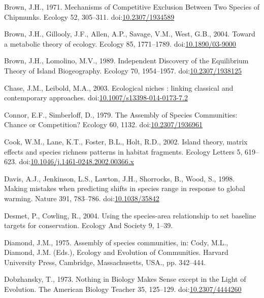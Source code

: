 \hypertarget{ref-Brown1971}{}
Brown, J.H., 1971. Mechanisms of Competitive Exclusion Between Two
Species of Chipmunks. Ecology 52, 305--311.
doi:\href{https://doi.org/10.2307/1934589}{10.2307/1934589}

\hypertarget{ref-Brown2004}{}
Brown, J.H., Gillooly, J.F., Allen, A.P., Savage, V.M., West, G.B.,
2004. Toward a metabolic theory of ecology. Ecology 85, 1771--1789.
doi:\href{https://doi.org/10.1890/03-9000}{10.1890/03-9000}

\hypertarget{ref-Brown1989}{}
Brown, J.H., Lomolino, M.V., 1989. Independent Discovery of the
Equilibrium Theory of Island Biogeography. Ecology 70, 1954--1957.
doi:\href{https://doi.org/10.2307/1938125}{10.2307/1938125}

\hypertarget{ref-Chase2003}{}
Chase, J.M., Leibold, M.A., 2003. Ecological niches : linking classical
and contemporary approaches.
doi:\href{https://doi.org/10.1007/s13398-014-0173-7.2}{10.1007/s13398-014-0173-7.2}

\hypertarget{ref-Connor1979}{}
Connor, E.F., Simberloff, D., 1979. The Assembly of Species Communities:
Chance or Competition? Ecology 60, 1132.
doi:\href{https://doi.org/10.2307/1936961}{10.2307/1936961}

\hypertarget{ref-Cook2002}{}
Cook, W.M., Lane, K.T., Foster, B.L., Holt, R.D., 2002. Island theory,
matrix effects and species richness patterns in habitat fragments.
Ecology Letters 5, 619--623.
doi:\href{https://doi.org/10.1046/j.1461-0248.2002.00366.x}{10.1046/j.1461-0248.2002.00366.x}

\hypertarget{ref-Davis1998}{}
Davis, A.J., Jenkinson, L.S., Lawton, J.H., Shorrocks, B., Wood, S.,
1998. Making mistakes when predicting shifts in species range in
response to global warming. Nature 391, 783--786.
doi:\href{https://doi.org/10.1038/35842}{10.1038/35842}

\hypertarget{ref-Desmet2004}{}
Desmet, P., Cowling, R., 2004. Using the species-area relationship to
set baseline targets for conservation. Ecology And Society 9, 1--39.

\hypertarget{ref-Diamond1975}{}
Diamond, J.M., 1975. Assembly of species communities, in: Cody, M.L.,
Diamond, J.M. (Eds.), Ecology and Evolution of Communities. Harvard
University Press, Cambridge, Massachusetts, USA., pp. 342--444.

\hypertarget{ref-Dobzhansky1973}{}
Dobzhansky, T., 1973. Nothing in Biology Makes Sense except in the Light
of Evolution. The American Biology Teacher 35, 125--129.
doi:\href{https://doi.org/10.2307/4444260}{10.2307/4444260}

